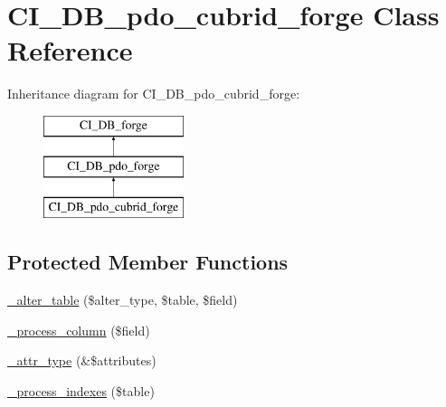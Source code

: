 \hypertarget{class_c_i___d_b__pdo__cubrid__forge}{}\section{C\+I\+\_\+\+D\+B\+\_\+pdo\+\_\+cubrid\+\_\+forge Class Reference}
\label{class_c_i___d_b__pdo__cubrid__forge}
Inheritance diagram for C\+I\+\_\+\+D\+B\+\_\+pdo\+\_\+cubrid\+\_\+forge\+:\begin{figure}[H]
\begin{center}
\leavevmode
\includegraphics[height=3.000000cm]{class_c_i___d_b__pdo__cubrid__forge}
\end{center}
\end{figure}
\subsection*{Protected Member Functions}
\begin{DoxyCompactItemize}
\item 
\hyperlink{class_c_i___d_b__pdo__cubrid__forge_a41c6cae02f2fda8b429ad0afb9509426}{\+\_\+alter\+\_\+table} (\$alter\+\_\+type, \$table, \$field)
\item 
\hyperlink{class_c_i___d_b__pdo__cubrid__forge_a8f38f1c5b5dddecca4befbe393f3f299}{\+\_\+process\+\_\+column} (\$field)
\item 
\hyperlink{class_c_i___d_b__pdo__cubrid__forge_a8553be952084c6f7cdfff370a1d14f6b}{\+\_\+attr\+\_\+type} (\&\$attributes)
\item 
\hyperlink{class_c_i___d_b__pdo__cubrid__forge_ae0bdb4ea3418590d1894c5b621b5ca50}{\+\_\+process\+\_\+indexes} (\$table)
\end{DoxyCompactItemize}
